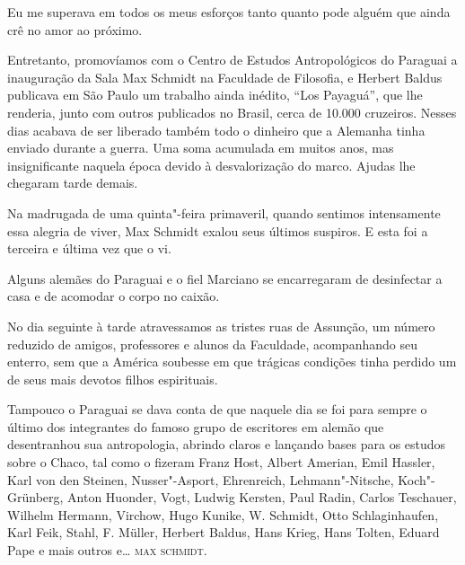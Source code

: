 Eu me superava em todos os meus esforços tanto quanto pode alguém que
ainda crê no amor ao próximo.

Entretanto, promovíamos com o Centro de Estudos Antropológicos do
Paraguai a inauguração da Sala Max Schmidt na Faculdade de Filosofia, e
Herbert Baldus publicava em São Paulo um trabalho ainda inédito, ``Los
Payaguá'', que lhe renderia, junto com outros publicados no Brasil,
cerca de 10.000 cruzeiros. Nesses dias acabava de ser liberado também
todo o dinheiro que a Alemanha tinha enviado durante a guerra. Uma soma
acumulada em muitos anos, mas insignificante naquela época devido à
desvalorização do marco. Ajudas lhe chegaram tarde demais.

Na madrugada de uma quinta"-feira primaveril, quando sentimos
intensamente essa alegria de viver, Max Schmidt exalou seus últimos
suspiros. E esta foi a terceira e última vez que o vi.

Alguns alemães do Paraguai e o fiel Marciano se encarregaram de
desinfectar a casa e de acomodar o corpo no caixão.

No dia seguinte à tarde atravessamos as tristes ruas de Assunção, um
número reduzido de amigos, professores e alunos da Faculdade,
acompanhando seu enterro, sem que a América soubesse em que trágicas
condições tinha perdido um de seus mais devotos filhos espirituais.

Tampouco o Paraguai se dava conta de que naquele dia se foi para sempre
o último dos integrantes do famoso grupo de escritores em alemão que
desentranhou sua antropologia, abrindo claros e lançando bases para os
estudos sobre o Chaco, tal como o fizeram Franz Host, Albert Amerian,
Emil Hassler, Karl von den Steinen, Nusser"-Asport, Ehrenreich,
Lehmann"-Nitsche, Koch"-Grünberg, Anton Huonder, Vogt, Ludwig Kersten,
Paul Radin, Carlos Teschauer, Wilhelm Hermann, Virchow, Hugo Kunike, W.
Schmidt, Otto Schlaginhaufen, Karl Feik, Stahl, F. Müller, Herbert
Baldus, Hans Krieg, Hans Tolten, Eduard Pape e mais outros e\ldots{} \textsc{max
schmidt}.

